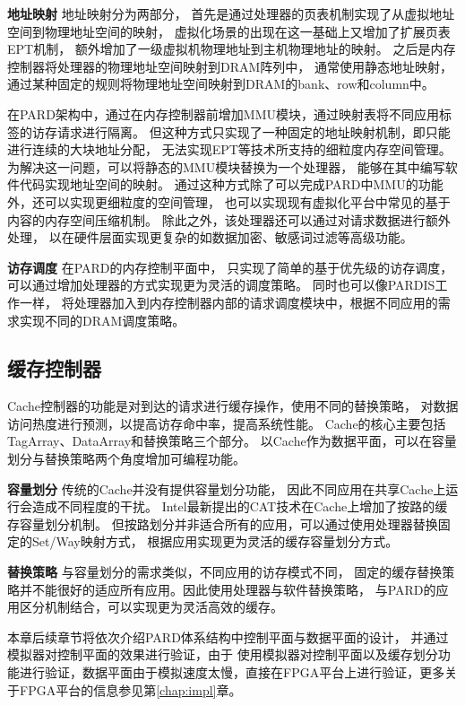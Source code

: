 \textbf{地址映射}\quad
地址映射分为两部分，
首先是通过处理器的页表机制实现了从虚拟地址空间到物理地址空间的映射，
虚拟化场景的出现在这一基础上又增加了扩展页表EPT机制，
额外增加了一级虚拟机物理地址到主机物理地址的映射。
之后是内存控制器将处理器的物理地址空间映射到DRAM阵列中，
通常使用静态地址映射，通过某种固定的规则将物理地址空间映射到DRAM的bank、row和column中。

在PARD架构中，通过在内存控制器前增加MMU模块，通过映射表将不同应用标签的访存请求进行隔离。
但这种方式只实现了一种固定的地址映射机制，即只能进行连续的大块地址分配，
无法实现EPT等技术所支持的细粒度内存空间管理。
为解决这一问题，可以将静态的MMU模块替换为一个处理器，
能够在其中编写软件代码实现地址空间的映射。
通过这种方式除了可以完成PARD中MMU的功能外，还可以实现更细粒度的空间管理，
也可以实现现有虚拟化平台中常见的基于内容的内存空间压缩机制。
除此之外，该处理器还可以通过对请求数据进行额外处理，
以在硬件层面实现更复杂的如数据加密、敏感词过滤等高级功能。

\textbf{访存调度}\quad
在PARD的内存控制平面中，
只实现了简单的基于优先级的访存调度，可以通过增加处理器的方式实现更为灵活的调度策略。
同时也可以像PARDIS\cite{bojnordi_pardis:_2012}工作一样，
将处理器加入到内存控制器内部的请求调度模块中，根据不同应用的需求实现不同的DRAM调度策略。

\subsection{缓存控制器}
Cache控制器的功能是对到达的请求进行缓存操作，使用不同的替换策略，
对数据访问热度进行预测，以提高访存命中率，提高系统性能。
Cache的核心主要包括TagArray、DataArray和替换策略三个部分。
以Cache作为数据平面，可以在容量划分与替换策略两个角度增加可编程功能。

\textbf{容量划分}\quad
传统的Cache并没有提供容量划分功能，
因此不同应用在共享Cache上运行会造成不同程度的干扰。
Intel最新提出的CAT技术\cite{intel-cat}在Cache上增加了按路的缓存容量划分机制。
但按路划分并非适合所有的应用，可以通过使用处理器替换固定的Set/Way映射方式，
根据应用实现更为灵活的缓存容量划分方式。

\textbf{替换策略}\quad
与容量划分的需求类似，不同应用的访存模式不同，
固定的缓存替换策略并不能很好的适应所有应用。因此使用处理器与软件替换策略，
与PARD的应用区分机制结合，可以实现更为灵活高效的缓存。

本章后续章节将依次介绍PARD体系结构中控制平面与数据平面的设计，
并通过模拟器对控制平面的效果进行验证，由于
使用模拟器对控制平面以及缓存划分功能进行验证，数据平面由于模拟速度太慢，直接在FPGA平台上进行验证，更多关于FPGA平台的信息参见第\ref{chap:impl}章。

